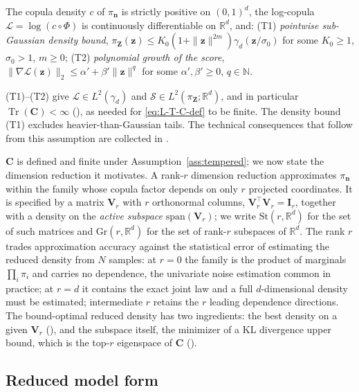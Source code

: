 \documentclass[review,hidelinks,onefignum,onetabnum]{siamart251216}
\newcommand{\RR}{\mathbb{R}}
\newcommand{\NN}{\mathbb{N}}
\newcommand{\tr}{\operatorname{Tr}}
\newcommand{\gauss}{\gamma}
\newcommand{\mC}{\bm{C}}
\newcommand{\mV}{\bm{V}}
\newcommand{\mI}{\bm{I}}
\newcommand{\St}{\mathrm{St}}
\newcommand{\Gr}{\mathrm{Gr}}
\newcommand{\vn}{\bm{n}}
\newcommand{\vz}{\bm{z}}
\newcommand{\vZ}{\bm{Z}}
\newcommand{\scL}{\mathcal{L}}
\newcommand{\scS}{\mathcal{S}}
\begin{document}
\begin{assumption}
\label{ass:tempered}
The copula density $c$ of $\pi_{\vn}$ is strictly positive on $(0,1)^d$, the log-copula $\scL = \log(c\circ\Phi)$ is continuously differentiable on $\RR^d$, and:
\textup{(T1)} \emph{pointwise sub-Gaussian density bound}, $\pi_{\vZ}(\vz) \le K_0(1+\|\vz\|^{2m})\gauss_d(\vz/\sigma_0)$ for some $K_0\ge 1$, $\sigma_0>1$, $m\ge 0$; \textup{(T2)} \emph{polynomial growth of the score}, $\|\nabla\scL(\vz)\|_2 \le \alpha' + \beta'\|\vz\|^q$ for some $\alpha', \beta' \ge 0$, $q\in\NN$.
\end{assumption}

\noindent (T1)--(T2) give $\scL\in L^2(\gauss_d)$ and $\scS \in L^2(\pi_{\vZ};\RR^d)$, and in particular $\tr(\mC)<\infty$ (), as needed for \eqref{eq:L-T-C-def} to be finite. The density bound (T1) excludes heavier-than-Gaussian tails. The technical consequences that follow from this assumption are collected in .

$\mC$ is defined and finite under Assumption~\ref{ass:tempered}; we now state the dimension reduction it motivates. A rank-$r$ dimension reduction approximates $\pi_{\vn}$ within the family whose copula factor depends on only $r$ projected coordinates. It is specified by a matrix $\mV_r$ with $r$ orthonormal columns, $\mV_r^\top\mV_r = \mI_r$, together with a density on the \emph{active subspace} $\mathrm{span}(\mV_r)$; we write $\St(r,\RR^d)$ for the set of such matrices and $\Gr(r,\RR^d)$ for the set of rank-$r$ subspaces of $\RR^d$. The rank $r$ trades approximation accuracy against the statistical error of estimating the reduced density from $N$ samples: at $r=0$ the family is the product of marginals $\prod_i\pi_i$ and carries no dependence, the univariate noise estimation common in practice; at $r=d$ it contains the exact joint law and a full $d$-dimensional density must be estimated; intermediate $r$ retains the $r$ leading dependence directions. The bound-optimal reduced density has two ingredients: the best density on a given $\mV_r$ (), and the subspace itself, the minimizer of a KL divergence upper bound, which is the top-$r$ eigenspace of $\mC$ ().

\subsection{Reduced model form}
\label{sec:reduced-form}
\end{document}
